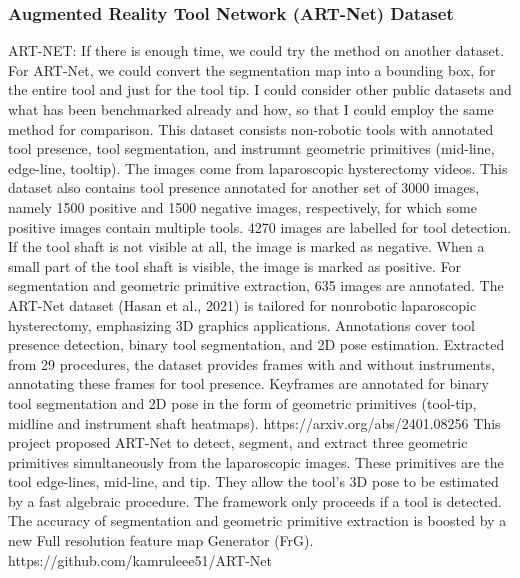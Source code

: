 

\subsubsection{Augmented Reality Tool Network (ART-Net) Dataset}

ART-NET: If there is enough time, we could try the method on another dataset. For ART-Net, we could convert the segmentation map into a bounding box, for the entire tool and just for the tool tip. I could consider other public datasets and what has been benchmarked already and how, so that I could employ the same method for comparison.
This dataset consists non-robotic tools with annotated tool presence, tool segmentation, and instrumnt geometric primitives (mid-line, edge-line, tooltip). The images come from laparoscopic hysterectomy videos. This dataset also contains tool presence annotated for another set of 3000 images, namely 1500 positive and 1500 negative images, respectively, for which some positive images contain multiple tools. 4270 images are labelled for tool detection. If the tool shaft is not visible at all, the image is marked as negative. When a small part of the tool shaft is visible, the image is marked as positive. For segmentation and geometric primitive extraction, 635 images are annotated.
The ART-Net dataset (Hasan et al., 2021) is tailored for nonrobotic laparoscopic hysterectomy, emphasizing 3D graphics applications. Annotations cover tool presence detection, binary tool segmentation, and 2D pose estimation. Extracted from 29 procedures, the dataset provides frames with and without instruments, annotating these frames for tool presence. Keyframes are annotated for binary tool segmentation and 2D pose in the form of geometric primitives (tool-tip, midline and instrument shaft heatmaps). https://arxiv.org/abs/2401.08256
This project proposed ART-Net to detect, segment, and extract three geometric primitives simultaneously from the laparoscopic images. These primitives are the tool edge-lines, mid-line, and tip. They allow the tool's 3D pose to be estimated by a fast algebraic procedure. The framework only proceeds if a tool is detected. The accuracy of segmentation and geometric primitive extraction is boosted by a new Full resolution feature map Generator (FrG). https://github.com/kamruleee51/ART-Net

